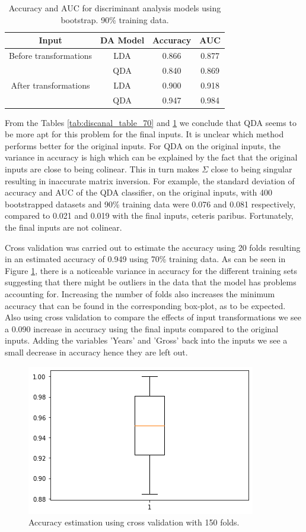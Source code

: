 \documentclass[../../project.tex]{subfiles}
\begin{document}
		\begin{table}[h!]
		\centering
		\begin{tabular}{cccc}
			Input & DA Model & Accuracy & AUC \\
			\midrule
			Before transformations
			& LDA & 0.866 & 0.877 \\
		    & QDA & 0.840 & 0.869 \\
			\midrule
			After transformations
			& LDA & 0.900 & 0.918 \\
			& QDA & 0.947 & 0.984 \\
		\end{tabular}
		\caption{Accuracy and AUC for discriminant analysis models using bootstrap. 90\% training data.}
		\label{tab:discanal_table_90}
	\end{table}
	From the Tables \ref{tab:discanal_table_70} and \ref{tab:discanal_table_90} we conclude that QDA seems to be more apt for this problem for the final inputs. It is unclear which method performs better for the original inputs. For QDA on the original inputs, the variance in accuracy is high which can be explained by the fact that the original inputs are close to being colinear. This in turn makes $\Sigma$ close to being singular resulting in inaccurate matrix inversion. For example, the standard deviation of accuracy and AUC of the QDA classifier, on the original inputs, with 400 bootstrapped datasets and 90\% training data were 0.076 and 0.081 respectively, compared to 0.021 and 0.019 with the final inputs, ceteris paribus. Fortunately, the final inputs are not colinear.
	
	Cross validation was carried out to estimate the accuracy using 20 folds resulting in an estimated accuracy of 0.949 using 70\% training data. As can be seen in Figure \ref{fig:boxplotQDA}, there is a noticeable variance in accuracy for the different training sets suggesting that there might be outliers in the data that the model has problems accounting for. Increasing the number of folds also increases the minimum accuracy that can be found in the corresponding box-plot, as to be expected. Also using cross validation to compare the effects of input transformations we see a 0.090 increase in accuracy using the final inputs compared to the original inputs. Adding the variables 'Years' and 'Gross' back into the inputs we see a small decrease in accuracy hence they are left out.
	\begin{figure}[h!]
		\centering
    	\includegraphics[scale=0.7]{project/tex/QDAboxplot.png}
		\caption{Accuracy estimation using cross validation with 150 folds.}
		\label{fig:boxplotQDA}
    \end{figure}
    
\end{document}
